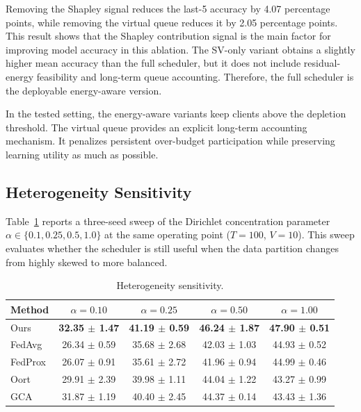 \documentclass[journal]{IEEEtran}
\begin{document}
Removing the Shapley signal reduces the last-5 accuracy by 4.07 percentage points, while removing the virtual queue reduces it by 2.05 percentage points. This result shows that the Shapley contribution signal is the main factor for improving model accuracy in this ablation. The SV-only variant obtains a slightly higher mean accuracy than the full scheduler, but it does not include residual-energy feasibility and long-term queue accounting. Therefore, the full scheduler is the deployable energy-aware version.

In the tested setting, the energy-aware variants keep clients above the depletion threshold. The virtual queue provides an explicit long-term accounting mechanism. It penalizes persistent over-budget participation while preserving learning utility as much as possible.

\subsection{Heterogeneity Sensitivity}

Table~\ref{tab:sens_alpha} reports a three-seed sweep of the Dirichlet concentration parameter $\alpha \in \{0.1, 0.25, 0.5, 1.0\}$ at the same operating point ($T=100$, $V=10$). This sweep evaluates whether the scheduler is still useful when the data partition changes from highly skewed to more balanced.

\begin{table}[!htbp]
\centering
\caption{Heterogeneity sensitivity.}
\label{tab:sens_alpha}
\scriptsize
\setlength{\tabcolsep}{2.0pt}
\renewcommand{\arraystretch}{1.12}
\begin{tabular}{l|c|c|c|c}
\hline
\textbf{Method} & $\alpha=0.10$ & $\alpha=0.25$ & $\alpha=0.50$ & $\alpha=1.00$ \\
\hline
Ours & \textbf{32.35 $\pm$ 1.47} & \textbf{41.19 $\pm$ 0.59} & \textbf{46.24 $\pm$ 1.87} & \textbf{47.90 $\pm$ 0.51} \\
FedAvg & 26.34 $\pm$ 0.59 & 35.68 $\pm$ 2.68 & 42.03 $\pm$ 1.03 & 44.93 $\pm$ 0.52 \\
FedProx & 26.07 $\pm$ 0.91 & 35.61 $\pm$ 2.72 & 41.96 $\pm$ 0.94 & 44.99 $\pm$ 0.46 \\
Oort & 29.91 $\pm$ 2.39 & 39.98 $\pm$ 1.11 & 44.04 $\pm$ 1.22 & 43.27 $\pm$ 0.99 \\
GCA & 31.87 $\pm$ 1.19 & 40.40 $\pm$ 2.45 & 44.37 $\pm$ 0.14 & 43.43 $\pm$ 1.36 \\
\hline
\end{tabular}
\end{table}
\end{document}
